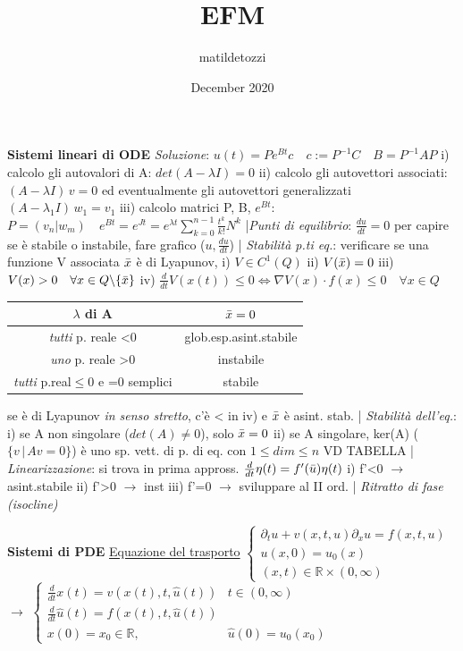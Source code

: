 \documentclass{article}
\title{EFM}
\author{matildetozzi}
\date{December 2020}
\begin{document}
\thispagestyle{empty}
\textbf{Sistemi lineari di ODE} \quad
\textit{Soluzione}: $u(t)=Pe^{Bt}c \quad c:=P^{-1}C \quad B=P^{-1}AP$ \quad i) calcolo gli autovalori di A: $det(A-\lambda I)=0$ \quad ii) calcolo gli autovettori associati: $(A-\lambda I)\,v = 0$ ed eventualmente gli autovettori generalizzati $(A-\lambda_1 I)\, w_1 = v_1$ \quad iii) calcolo matrici P, B, $e^{Bt}$: $P=(v_n | w_m) \quad e^{Bt}=e^{Jt}=e^{\lambda t}\sum_{k=0}^{n-1}\frac{t^k}{k!}N^k$ 
|\textit{Punti di equilibrio}: $\frac{du}{dt}=0$ per capire se è stabile o instabile, fare grafico ($u,\frac{du}{dt}$) 
| \textit{Stabilità p.ti eq.}: verificare se una funzione V associata $\Bar{x}$ è di Lyapunov, i) $V \in C^1 (Q)$ ii) $V(\Bar{x})=0$ iii) $V(x)>0 \quad \forall x \in Q \backslash \{ \Bar{x} \}$ iv) $\frac{d}{dt}V(x(t))\leq 0 \Leftrightarrow \nabla V(x) \cdot f(x) \leq 0 \quad \forall x \in Q$
\begin{table}
\begin{tabular}{c|c}
$\lambda$ di A & $\Bar{x}=0$ \\
\hline
\textit{tutti} p. reale <0 & glob.esp.asint.stabile \\ 
\textit{uno} p. reale >0 & instabile \\
\textit{tutti} p.real$\leq0$ e =0 semplici & stabile
\end{tabular}
\end{table}
se è di Lyapunov \textit{in senso stretto}, c'è < in iv) e $\Bar{x}$ è asint. stab.
| \textit{Stabilità dell'eq.}: i) se A non singolare ($det(A)\neq 0$), solo $\Bar{x}=0$ ii) se A singolare, ker(A) ($\{ v\,|\, Av=0\}$) è uno sp. vett. di p. di eq. con $1\leq dim \leq n$ VD TABELLA
| \textit{Linearizzazione}: si trova in prima appross. $\frac{d}{dt}\eta (t) = f'(\Bar{u})\eta (t)$ i) f'<0 $\rightarrow$ asint.stabile ii) f'>0 $\rightarrow$ inst iii) f'=0 $\rightarrow$ sviluppare al II ord.
| \textit{Ritratto di fase (isocline)} 

\textbf{Sistemi di PDE} \quad 
\underline{Equazione del trasporto} $ \left\{ \begin{array}{l}
\partial_t u + v(x,t,u)\partial_x u = f(x,t,u) 
\\ u(x,0) = u_0 (x)
\\ (x,t) \in \mathbb{R} \times (0,\infty) 
\end{array}\right.$ $\rightarrow$
$ \left\{ \begin{array}{ll}
\frac{d}{dt}x(t) = v(x(t),t,\hat{u}(t)) & t \in (0,\infty) 
\\ \frac{d}{dt}\hat{u}(t)=f(x(t),t,\hat{u}(t)) &
\\ x(0)=x_0 \in \mathbb{R}, & \hat{u}(0)=u_0 (x_0)
\end{array}\right.$
\end{document}
